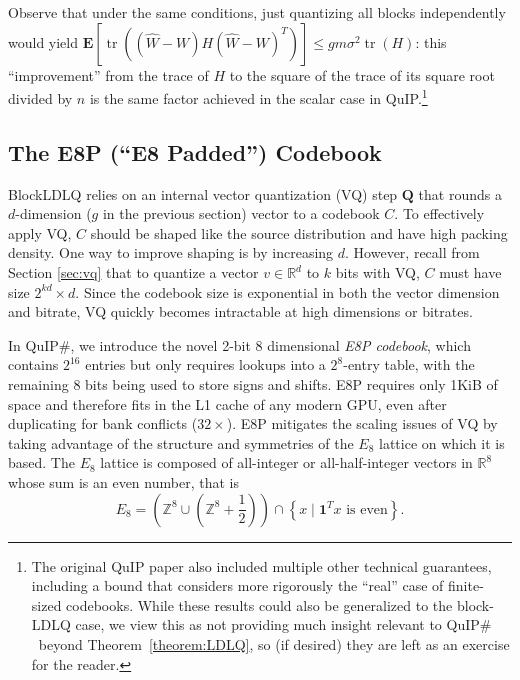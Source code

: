Observe that under the same conditions, just quantizing all blocks independently would yield $\mathbf{E}[\operatorname{tr}((\hat W - W)H(\hat W - W)^T)]
\le
g m \sigma^2 \operatorname{tr}(H)$: this ``improvement'' from the trace of $H$ to the square of the trace of its square root divided by $n$ is the same factor achieved in the scalar case in QuIP.\footnote{The original QuIP paper also included multiple other technical guarantees, including a bound that considers more rigorously the ``real'' case of finite-sized codebooks. While these results could also be generalized to the block-LDLQ case, we view this as not providing much insight relevant to QuIP$\#$\  beyond Theorem~\ref{theorem:LDLQ}, so (if desired) they are left as an exercise for the reader.}

\subsection{The E8P (``E8 Padded'') Codebook}

\label{sec:e8pconstruct}

BlockLDLQ relies on an internal vector quantization (VQ) step $\mathbf{Q}$ that rounds a $d$-dimension ($g$ in the previous section) vector to a codebook $C$. To effectively apply VQ, $C$ should be shaped like the source distribution and have high packing density. One way to improve shaping is by increasing $d$. However, recall from Section \ref{sec:vq} that to quantize a vector $v \in \mathbb{R}^{d}$ to $k$ bits with VQ, $C$ must have size $2^{kd} \times d$. Since the codebook size is exponential in both the vector dimension and bitrate, VQ quickly becomes intractable at high dimensions or bitrates.

In QuIP$\#$, we introduce the novel 2-bit 8 dimensional \emph{E8P codebook}, which contains $2^{16}$ entries but only requires lookups into a $2^8$-entry table, with the remaining $8$ bits being used to store signs and shifts. E8P requires only 1KiB of space and therefore fits in the L1 cache of any modern GPU, even after duplicating for bank conflicts ($32 \times$).
E8P mitigates the scaling issues of VQ by taking advantage of the structure and symmetries of the $E_8$ lattice on which it is based. The $E_8$ lattice is composed of all-integer or all-half-integer vectors in $\mathbb{R}^8$ whose sum is an even number, that is
\[ 
    \textstyle
    E_8 = \left(\mathbb{Z}^8 \cup \left(\mathbb{Z}^8+\frac{1}{2}\right) \right) \cap
    \left\{ x \mid \mathbf{1}^T x \text{ is even} \right\}.
\]

